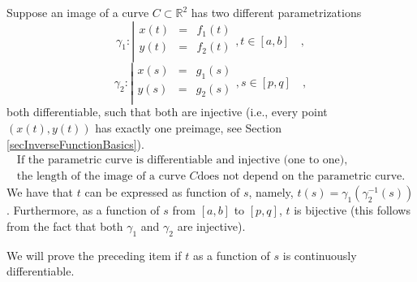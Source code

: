 \documentclass[12pt]{book}
\newcommand{\importantFormula}[1]{\begin{equation} \boxed{#1} \end{equation}}
\begin{document}
Suppose an image of a curve $C\subset \mathbb R^2$ has two different parametrizations
\begin{equation}\label{eqDefCurve1}
\gamma_1:\left|
\begin{array}{rcl}
x(t)&=&f_1(t)\\
y(t)&=&f_2(t)\\
\end{array}\right., t\in [a,b]\quad ,
\end{equation}
\begin{equation}\label{eqDefCurve2}
\gamma_2:\left|
\begin{array}{rcl}
x(s)&=&g_1(s)\\
y(s)&=&g_2(s)\\
\end{array}\right. , s\in [p,q]\quad ,
\end{equation}
both differentiable, such that both are injective (i.e., every point $(x(t), y(t))$ has exactly one preimage, see Section \ref{secInverseFunctionBasics}).
\importantFormula{
\begin{array}{c}
\text{If the parametric curve is differentiable and injective (one to one),}\\
\text{the length of the image of a curve } C
\text{does not depend on the parametric curve.}
\end{array}
}
We have that $t$ can be expressed as function of $s$, namely, $t(s)= \gamma_1(\gamma_2^{-1}(s))$. Furthermore, as a function of $s$ from $[a,b]$ to $[p,q]$, $t$ is bijective (this follows from the fact that both $\gamma_1$ and $\gamma_2$ are injective).

We will prove the preceding item if $t$ as a function of $s$ is  continuously differentiable.
\end{document}
